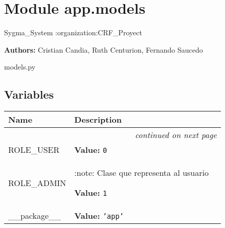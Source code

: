 %
%
%


\section{Module app.models}

    \label{app:models}
Sygma\_System :organization:CRF\_Proyect

\textbf{Authors:}
Cristian Candia,
    Ruth Centurion,
    Fernando Saucedo

models.py



  \subsection{Variables}

    \vspace{-1cm}
\hspace{\varindent}\begin{longtable}{|p{\varnamewidth}|p{\vardescrwidth}|l}
\cline{1-2}
\cline{1-2} \centering \textbf{Name} & \centering \textbf{Description}& \\
\cline{1-2}
\endhead\cline{1-2}\multicolumn{3}{r}{\small\textit{continued on next page}}\\\endfoot\cline{1-2}
\endlastfoot\raggedright R\-O\-L\-E\-\_\-U\-S\-E\-R\- & \raggedright \textbf{Value:} 
{\tt 0}&\\
\cline{1-2}
\raggedright R\-O\-L\-E\-\_\-A\-D\-M\-I\-N\- & \raggedright :note: Clase que representa al usuario

\textbf{Value:} 
{\tt 1}&\\
\cline{1-2}
\raggedright \_\-\_\-p\-a\-c\-k\-a\-g\-e\-\_\-\_\- & \raggedright \textbf{Value:} 
{\tt \texttt{'}\texttt{app}\texttt{'}}&\\
\cline{1-2}
\end{longtable}

